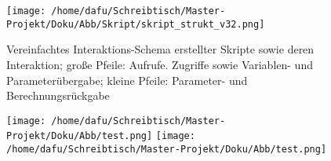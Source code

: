 \documentclass[onecolumn,10pt,titlepage]{article}
\begin{document}
  
 
\begin{figure}[H]
	
	\centering
	\texttt{[image: /home/dafu/Schreibtisch/Master-Projekt/Doku/Abb/Skript/skript\_strukt\_v32.png]}
	\caption[Skript-Interaktions-Schema]{Vereinfachtes Interaktions-Schema erstellter Skripte sowie deren Interaktion; große Pfeile: Aufrufe. Zugriffe sowie Variablen- und Parameterübergabe; kleine Pfeile: Parameter- und Berechnungsrückgabe}
	\label{fig:Strukt_Skript} 
\end{figure}


\begin{figure}[H]
	
	\centering
	\texttt{[image: /home/dafu/Schreibtisch/Master-Projekt/Doku/Abb/test.png]}
	\texttt{[image: /home/dafu/Schreibtisch/Master-Projekt/Doku/Abb/test.png]}
	\caption{ }
	\label{fig:Strukt_Funkt_oa} 
\end{figure}
\end{document}
